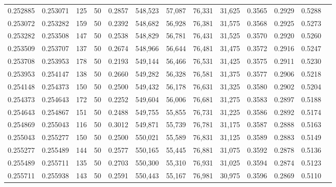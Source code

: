 \begin{tabular}{rrrrrrrrrrrrr}
0.252885 & 0.253071 &   125 &  50 &                                     0.2857 & 548,523 &  57,087 &  76,331 &  31,625 & 0.3565 & 0.2929 & 0.5288 \\
0.253072 & 0.253282 &   159 &  50 &                                     0.2392 & 548,682 &  56,928 &  76,381 &  31,575 & 0.3568 & 0.2925 & 0.5273 \\
0.253282 & 0.253508 &   147 &  50 &                                     0.2538 & 548,829 &  56,781 &  76,431 &  31,525 & 0.3570 & 0.2920 & 0.5260 \\
0.253509 & 0.253707 &   137 &  50 &                                     0.2674 & 548,966 &  56,644 &  76,481 &  31,475 & 0.3572 & 0.2916 & 0.5247 \\
0.253708 & 0.253953 &   178 &  50 &                                     0.2193 & 549,144 &  56,466 &  76,531 &  31,425 & 0.3575 & 0.2911 & 0.5230 \\
0.253953 & 0.254147 &   138 &  50 &                                     0.2660 & 549,282 &  56,328 &  76,581 &  31,375 & 0.3577 & 0.2906 & 0.5218 \\
0.254148 & 0.254373 &   150 &  50 &                                     0.2500 & 549,432 &  56,178 &  76,631 &  31,325 & 0.3580 & 0.2902 & 0.5204 \\
0.254373 & 0.254643 &   172 &  50 &                                     0.2252 & 549,604 &  56,006 &  76,681 &  31,275 & 0.3583 & 0.2897 & 0.5188 \\
0.254643 & 0.254867 &   151 &  50 &                                     0.2488 & 549,755 &  55,855 &  76,731 &  31,225 & 0.3586 & 0.2892 & 0.5174 \\
0.254869 & 0.255043 &   116 &  50 &                                     0.3012 & 549,871 &  55,739 &  76,781 &  31,175 & 0.3587 & 0.2888 & 0.5163 \\
0.255043 & 0.255277 &   150 &  50 &                                     0.2500 & 550,021 &  55,589 &  76,831 &  31,125 & 0.3589 & 0.2883 & 0.5149 \\
0.255277 & 0.255489 &   144 &  50 &                                     0.2577 & 550,165 &  55,445 &  76,881 &  31,075 & 0.3592 & 0.2878 & 0.5136 \\
0.255489 & 0.255711 &   135 &  50 &                                     0.2703 & 550,300 &  55,310 &  76,931 &  31,025 & 0.3594 & 0.2874 & 0.5123 \\
0.255711 & 0.255938 &   143 &  50 &                                     0.2591 & 550,443 &  55,167 &  76,981 &  30,975 & 0.3596 & 0.2869 & 0.5110 \\

\end{tabular}
